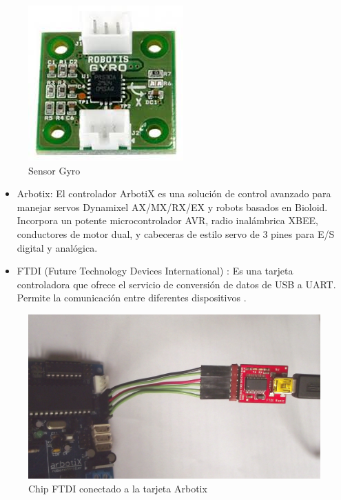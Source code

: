 \begin{figure}[hbtp]
\centering
\includegraphics[scale=0.5]{imagenes/gyro.jpg}
\caption{Sensor Gyro}
\end{figure}

\begin{itemize}
\item Arbotix: El controlador ArbotiX es una solución de control avanzado para manejar servos Dynamixel AX/MX/RX/EX y robots
basados en Bioloid. Incorpora un potente microcontrolador AVR, radio inalámbrica XBEE, conductores de motor dual, y cabeceras
de estilo servo de 3 pines para E/S digital y analógica.\cite{arbotix}

\end{itemize}


\begin{itemize}
\item FTDI (Future Technology Devices International) : Es una tarjeta controladora que ofrece el servicio de conversión de 
datos de USB a UART. Permite la comunicación entre diferentes dispositivos \cite{ftdi}.

\end{itemize}

\begin{figure}[hbtp]
\centering
\includegraphics[scale=0.09]{imagenes/DSCF1162.jpg}
\caption{Chip FTDI conectado a la tarjeta Arbotix}
\end{figure}


